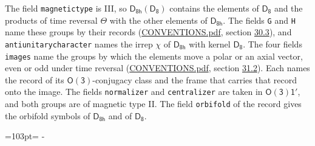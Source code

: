 \documentclass[10pt,a4paper]{article}
\newcommand{\needspace}[1]{\par\penalty-100\begingroup\dimen0=#1\relax\dimen2=\pagegoal
  \advance\dimen2-\pagetotal\ifdim\dimen0>\dimen2\relax\ifdim\dimen2>0pt\vfil\break\fi\fi
  \endgroup}
\numberwithin{equation}{section}
\newcommand{\grp}[1]{\mathsf{#1}}
\begin{document}
The field \texttt{magnetictype} is III, so $\grp{D_{8h}}(\grp{D_{8}})$ contains the elements of $\grp{D_{8}}$ and the products of time reversal $\varTheta$ with the other elements of $\grp{D_{8h}}$. The fields \texttt{G} and \texttt{H} name these groups by their records (\href{../../CONVENTIONS.pdf}{CONVENTIONS.pdf}, section \href{../../CONVENTIONS.pdf\#conv.30.3}{30.3}), and \texttt{antiunitarycharacter} names the irrep $\chi$ of $\grp{D_{8h}}$ with kernel $\grp{D_{8}}$. The four fields \texttt{images} name the groups by which the elements move a polar or an axial vector, even or odd under time reversal (\href{../../CONVENTIONS.pdf}{CONVENTIONS.pdf}, section \href{../../CONVENTIONS.pdf\#conv.31.2}{31.2}). Each names the record of its $\grp{O(3)}$-conjugacy class and the frame that carries that record onto the image. The fields \texttt{normalizer} and \texttt{centralizer} are taken in $\grp{O(3)1'}$, and both groups are of magnetic type II. The field \texttt{orbifold} of the record gives the orbifold symbols of $\grp{D_{8h}}$ and of $\grp{D_{8}}$.
\needspace{103pt}
\end{document}
